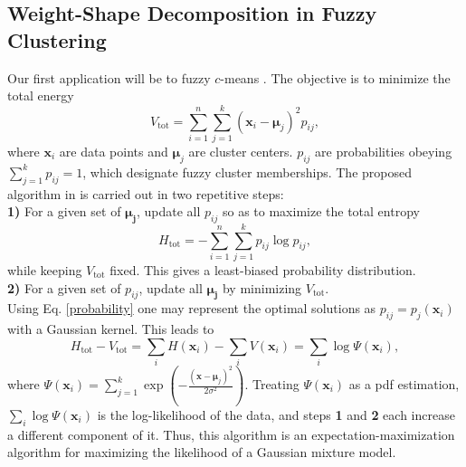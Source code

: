 \documentclass[preprint,12pt]{elsarticle}
\begin{document}
\subsection{Weight-Shape Decomposition in Fuzzy Clustering}
\label{fuzzy}
Our first application will be to fuzzy $c$-means \cite{bezdek1984}. The objective is to minimize the total energy
\begin{equation}\label{Vtot}
  V_\textrm{tot} = \sum_{i=1}^n\sum_{j=1}^k \left( \mathbf{x}_i-\boldsymbol{\mu}_j \right)^2 p_{ij},
\end{equation}
where $\mathbf{x}_i$ are data points and $\boldsymbol{\mu}_j$ are cluster centers. $p_{ij}$ are probabilities obeying $\sum_{j=1}^{k}p_{ij}=1$, which designate fuzzy cluster memberships. The proposed algorithm in \cite{li1995,rose1990} is carried out in two repetitive steps:\\
\textbf{1)} For a given set of $\boldsymbol{\mu_j}$, update all $p_{ij}$ so as to maximize the total entropy
\begin{equation}\label{Htot}
  H_\textrm{tot} = -\sum_{i=1}^n\sum_{j=1}^k p_{ij} \log p_{ij},
\end{equation}
while keeping $V_\textrm{tot}$ fixed. This gives a least-biased probability distribution.\\
\textbf{2)} For a given set of $p_{ij}$, update all $\boldsymbol{\mu_j}$ by minimizing $V_\textrm{tot}$.\\
Using Eq. \ref{probability} one may represent the optimal solutions as $p_{ij}=p_j\left(\mathbf{x}_i\right)$ with a Gaussian kernel. This leads to
\begin{equation}\label{Htot_minus_Vtot}
  H_\textrm{tot}-V_\textrm{tot} = \sum_i H\left(\mathbf{x}_i\right)-\sum_i V\left(\mathbf{x}_i\right)=\sum_i \log\Psi\left(\mathbf{x}_i\right),
\end{equation}
where $\Psi\left(\mathbf{x}_i\right)=\sum_{j=1}^k \exp\left(-\frac{\left(\mathbf{x}-\boldsymbol{\mu}_j\right)^2}{2\sigma^2}\right)$. Treating $\Psi\left(\mathbf{x}_i\right)$ as a pdf estimation, $\sum_i \log\Psi\left(\mathbf{x}_i\right)$ is the log-likelihood of the data, and steps \textbf{1} and \textbf{2} each increase a different component of it. Thus, this algorithm is an expectation-maximization algorithm for maximizing the likelihood of a Gaussian mixture model.
\end{document}
